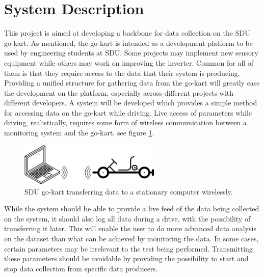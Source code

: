 \section{System Description}
\label{sec:system_description}
This project is aimed at developing a backbone for data collection on the SDU go-kart.
As mentioned, the go-kart is intended as a development platform to be used by engineering students at SDU.
Some projects may implement new sensory equipment while others may work on improving the inverter.
Common for all of them is that they require access to the data that their system is producing.
Providing a unified structure for gathering data from the go-kart will greatly ease the development on the platform, especially across different projects with different developers.
A system will be developed which provides a simple method for accessing data on the go-kart while driving.
Live access of parameters while driving, realistically, requires some form of wireless communication between a monitoring system and the go-kart, see figure \ref{fig:simple}.

\begin{figure}[h]
 	\centering
    \includegraphics[width=0.6\textwidth]{graphics/go_kart_network_simple}
    \caption[SDU go-kart transferring data wirelessly.]{SDU go-kart transferring data to a stationary computer wirelessly.}
    \label{fig:simple}
\end{figure}

While the system should be able to provide a live feed of the data being collected on the system, it should also log all data during a drive, with the possibility of transferring it later.
This will enable the user to do more advanced data analysis on the dataset than what can be achieved by monitoring the data.
In some cases, certain parameters may be irrelevant to the test being performed.
Transmitting these parameters should be avoidable by providing the possibility to start and stop data collection from specific data producers.

